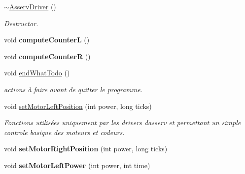 \begin{DoxyCompactItemize}
\mbox{\label{classAsservDriver_a5960b3ced1e727d33ded6ff469fc1a78}} 
\hyperlink{classAsservDriver_a5960b3ced1e727d33ded6ff469fc1a78}{$\sim$\+Asserv\+Driver} ()
\begin{DoxyCompactList}\small\item\em Destructor. \end{DoxyCompactList}\item 
\mbox{\label{classAsservDriver_a8b02e6ec0a124ca9178f17c829d48513}} 
void {\bfseries compute\+CounterL} ()
\item 
\mbox{\label{classAsservDriver_af852b42fef0dbd773141d5e5fd0a74f6}} 
void {\bfseries compute\+CounterR} ()
\item 
\mbox{\label{classAsservDriver_a636bf5413d2cf0419f188a4965340758}} 
void \hyperlink{classAsservDriver_a636bf5413d2cf0419f188a4965340758}{end\+What\+Todo} ()
\begin{DoxyCompactList}\small\item\em actions à faire avant de quitter le programme. \end{DoxyCompactList}\item 
\mbox{\label{classAsservDriver_a49dad05da23fe62aa4bf582199eaa3a6}} 
void \hyperlink{classAsservDriver_a49dad05da23fe62aa4bf582199eaa3a6}{set\+Motor\+Left\+Position} (int power, long ticks)
\begin{DoxyCompactList}\small\item\em Fonctions utilisées uniquement par les drivers d\textquotesingle{}asserv et permettant un simple controle basique des moteurs et codeurs. \end{DoxyCompactList}\item 
\mbox{\label{classAsservDriver_a62a57e92e4933413d9c3c6b62f496ef3}} 
void {\bfseries set\+Motor\+Right\+Position} (int power, long ticks)
\item 
\mbox{\label{classAsservDriver_a3b702233fa09a657bb03372470152376}} 
void {\bfseries set\+Motor\+Left\+Power} (int power, int time)
\item 
\mbox{\label{classAsservDriver_a54e742670bae9a19dc70b982cad4c3ba}} 

\end{DoxyCompactItemize}
